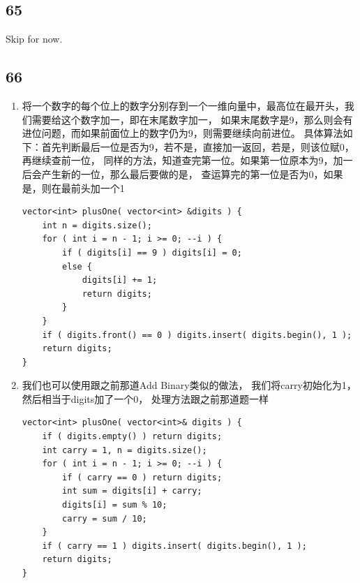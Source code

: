 \documentclass[12pt,a4paper]{article}
\begin{document}
\subsection{65}
Skip for now. 

\subsection{66}
\begin{enumerate}
\item
\begin{CJK}{UTF8}{gbsn}
将一个数字的每个位上的数字分别存到一个一维向量中，最高位在最开头，我们需要给这个数字加一，即在末尾数字加一，
如果末尾数字是9，那么则会有进位问题，而如果前面位上的数字仍为9，则需要继续向前进位。
具体算法如下：首先判断最后一位是否为9，若不是，直接加一返回，若是，则该位赋0，再继续查前一位，
同样的方法，知道查完第一位。如果第一位原本为9，加一后会产生新的一位，那么最后要做的是，
查运算完的第一位是否为0，如果是，则在最前头加一个1
\end{CJK}
\begin{lstlisting}
vector<int> plusOne( vector<int> &digits ) {
	int n = digits.size();
	for ( int i = n - 1; i >= 0; --i ) {
		if ( digits[i] == 9 ) digits[i] = 0;
		else {
			digits[i] += 1;
			return digits;
		}
	}
	if ( digits.front() == 0 ) digits.insert( digits.begin(), 1 );
	return digits;
}
\end{lstlisting}
\item
\begin{CJK}{UTF8}{gbsn}
我们也可以使用跟之前那道Add Binary类似的做法，
我们将carry初始化为1，然后相当于digits加了一个0，
处理方法跟之前那道题一样
\end{CJK}
\begin{lstlisting}
vector<int> plusOne( vector<int>& digits ) {
	if ( digits.empty() ) return digits;
	int carry = 1, n = digits.size();
	for ( int i = n - 1; i >= 0; --i ) {
		if ( carry == 0 ) return digits;
		int sum = digits[i] + carry;
		digits[i] = sum % 10;
		carry = sum / 10;
	}
	if ( carry == 1 ) digits.insert( digits.begin(), 1 );
	return digits;
}
\end{lstlisting}
\end{enumerate}
\end{document}
